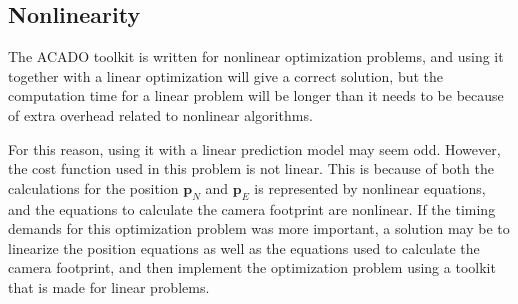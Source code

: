 \subsection{Nonlinearity}

The ACADO toolkit is written for nonlinear optimization problems, and using it together with a linear optimization will give a correct solution, but the computation time for a linear problem will be longer than it needs to be because of extra overhead related to nonlinear algorithms.

For this reason, using it with a linear prediction model may seem odd. However, the cost function used in this problem is not linear. This is because of both the calculations for the position $\mathbf{p}_N$ and $\mathbf{p}_E$ is represented by nonlinear equations, and the equations to calculate the camera footprint are nonlinear. If the timing demands for this optimization problem was more important, a solution may be to linearize the position equations as well as the equations used to calculate the camera footprint, and then implement the optimization problem using a toolkit that is made for linear problems.